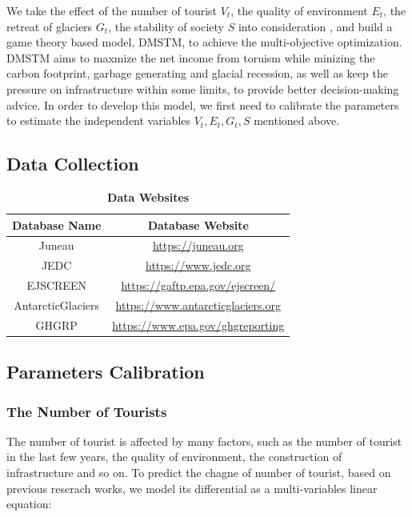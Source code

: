 \documentclass{mcmthesis}
\begin{document}
We take the effect of the number of tourist $V_t$, the quality of environment $E_t$, 
the retreat of glaciers $G_t$, the stability of society $S$ into consideration , 
and build a game theory based model\cite{Wang2021}, DMSTM, to achieve the multi-objective optimization.
DMSTM aims to maxmize the net income from toruism while minizing the carbon footprint,
garbage generating and glacial recession, as well as keep the pressure on infrastructure within some limits,
to provide better decision-making advice.
In order to develop this model, we first need to calibrate the parameters to estimate 
the independent variables $V_t, E_t, G_t, S$ mentioned above.

\subsection{Data Collection}
\begin{table}[H]
  \caption{\textbf{Data Websites}} 
  \centering
  \begin{tabular}{cc}
    \toprule 
      Database Name & Database Website \\
    \midrule
      Juneau & \href{https://juneau.org}{https://juneau.org} \\ 
      JEDC & \href{https://www.jedc.org}{https://www.jedc.org} \\
      EJSCREEN & \href{https://gaftp.epa.gov/ejscreen/}{https://gaftp.epa.gov/ejscreen/} \\ 
      AntarcticGlaciers & \href{https://www.antarcticglaciers.org}{https://www.antarcticglaciers.org} \\
      GHGRP & \href{https://www.epa.gov/ghgreporting}{https://www.epa.gov/ghgreporting} \\
    \bottomrule
  \end{tabular}
\end{table}

\subsection{Parameters Calibration}

\subsubsection{The Number of Tourists}
The number of tourist is affected by many factors, such as the number of tourist in the last few years, 
the quality of environment, the construction of infrastructure and so on. To predict the chagne of number of tourist,
based on previous reserach works\cite{johnston2005dynamic}, we model its differential as a multi-variables linear equation:
\end{document}
